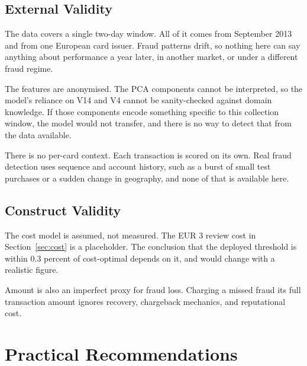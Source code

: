 \subsection{External Validity}

The data covers a single two-day window. All of it comes from September 2013 and from
one European card issuer. Fraud patterns drift, so nothing here can say anything about
performance a year later, in another market, or under a different fraud regime.

The features are anonymised. The PCA components cannot be interpreted, so the model's
reliance on V14 and V4 cannot be sanity-checked against domain knowledge. If those
components encode something specific to this collection window, the model would not
transfer, and there is no way to detect that from the data available.

There is no per-card context. Each transaction is scored on its own. Real fraud detection
uses sequence and account history, such as a burst of small test purchases or a sudden
change in geography, and none of that is available here.

\subsection{Construct Validity}

The cost model is assumed, not measured. The EUR 3 review cost in
Section~\ref{sec:cost} is a placeholder. The conclusion that the deployed threshold is
within 0.3 percent of cost-optimal depends on it, and would change with a realistic figure.

Amount is also an imperfect proxy for fraud loss. Charging a missed fraud its full
transaction amount ignores recovery, chargeback mechanics, and reputational cost.

\section{Practical Recommendations}

